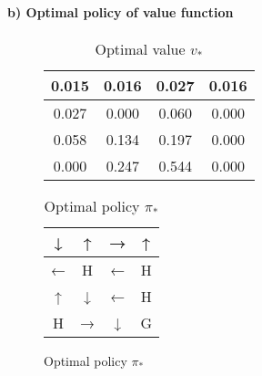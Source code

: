 \documentclass{article}
\begin{document}
\paragraph*{b) Optimal policy of value function}
\begin{figure}[H]
    \begin{minipage}{0.45\textwidth}
    \centering
        \begin{table}[H]
            \centering
            \begin{tabular}{c|c|c|c}
                0.015 & 0.016 & 0.027 & 0.016 \\ \hline
                0.027 & 0.000 & 0.060 & 0.000 \\ \hline
                0.058 & 0.134 & 0.197 & 0.000 \\ \hline
                0.000 & 0.247 & 0.544 & 0.000 \\
            \end{tabular}
            \caption{Optimal value $v_*$}
            \label{tab:table3}  
        \end{table}
    \end{minipage}
    \begin{minipage}{0.45\textwidth}
        \begin{table}[H]
        \centering
        \begin{tabular}{c|c|c|c}
        ↓ &↑& →& ↑ \\ \hline
        ← &H& ←& H \\ \hline
        ↑ &↓& ←& H \\ \hline
        H &→& ↓& G
        \end{tabular}
        \caption{Optimal policy $\pi_*$}
        \label{tab:pi_star}
        \end{table}
    \end{minipage}
\end{figure}
\end{document}
